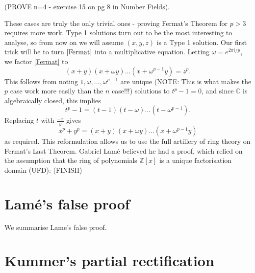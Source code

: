 (PROVE n=4 - exercise 15 on pg 8 in Number Fields).

These cases are truly the only trivial ones - proving Fermat's Theorem for $p>3$ requires more work. Type 1 solutions turn out to be the most interesting to analyse, so from now on we will assume $(x,y,z)$ is a Type 1 solution. Our first trick will be to turn $\cref{Fermat}$ into a multiplicative equation. Letting $\omega=e^{2\pi i/p}$, we factor \cref{Fermat} to
$$(x+y)(x+\omega y)\dots(x+\omega^{p-1} y)=z^p.$$
This follows from noting $1,\omega,\dots,\omega^{p-1}$ are unique (NOTE: This is what makes the $p$ case work more easily than the $n$ case!!!) solutions to $t^p-1=0$, and since $\mathbb{C}$ is algebraically closed, this implies
\begin{equation}\label{eq-omega-polynomial}t^p-1=(t-1)(t-\omega)\dots (t-\omega^{p-1}).\end{equation}
Replacing $t$ with $\frac{-x}{y}$ gives
$$x^p+y^p=(x+y)(x+\omega y)\dots (x+\omega^{p-1}y)$$
as required. This reformulation allows us to use the full artillery of ring theory on Fermat's Last Theorem.
Gabriel Lamé believed he had a proof, which relied on the assumption that the ring of polynomials $\mathbb{Z}[x]$ is a unique factorisation domain (UFD): (FINISH)

\section{Lamé's false proof}
We summarise Lame's false proof.
\section{Kummer's partial rectification}
